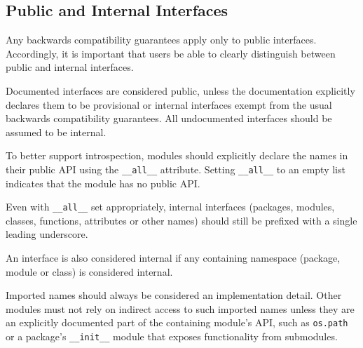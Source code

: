 \documentclass[a4paper,11pt]{article}
\begin{document}
\subsection{Public and Internal Interfaces}
Any backwards compatibility guarantees apply only to public interfaces. 
Accordingly, it is important that users be able to clearly distinguish 
between public and internal interfaces.
\par
Documented interfaces are considered public, unless the documentation 
explicitly declares them to be provisional or internal interfaces exempt from 
the usual backwards compatibility guarantees. All undocumented interfaces 
should be assumed to be internal.
\par
To better support introspection, modules should explicitly declare the names 
in their public API using the \verb"__all__" attribute. Setting 
\verb"__all__" to an empty list indicates that the module has no public API.
\par
Even with \verb"__all__" set appropriately, internal interfaces (packages, 
modules, classes, functions, attributes or other names) should still be 
prefixed with a single leading underscore.
\par
An interface is also considered internal if any containing namespace 
(package, module or class) is considered internal.
\par
Imported names should always be considered an implementation detail. Other 
modules must not rely on indirect access to such imported names unless they 
are an explicitly documented part of the containing module’s API, such as 
\verb"os.path" or a package’s \verb"__init__" module that exposes 
functionality from submodules.
\end{document}
